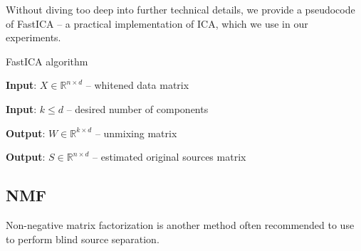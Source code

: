 \documentclass[../main.tex]{subfiles} %
\begin{document}
Without diving too deep into further technical details, we provide a pseudocode of FastICA -- a practical implementation of ICA, which we use in our experiments.

\begin{algorithm} 
	\begin{algorithmic}
		\caption{FastICA algorithm}\label{fastica}
		\item \textbf{Input}: $X \in \mathbb{R}^{n \times d}$ -- whitened data matrix
		\item \textbf{Input}: $k \le d$ -- desired number of components
		\item \textbf{Output}: $W \in \mathbb{R}^{k \times d}$ -- unmixing matrix
		\item \textbf{Output}: $S \in \mathbb{R}^{n \times d}$ -- estimated original sources matrix
		
		\EndWhile
		\EndFor
		\EndFunction
		
	\end{algorithmic}
\end{algorithm}

\subsection{NMF}

Non-negative matrix factorization is another method often recommended to use to perform blind source separation.
\end{document}
